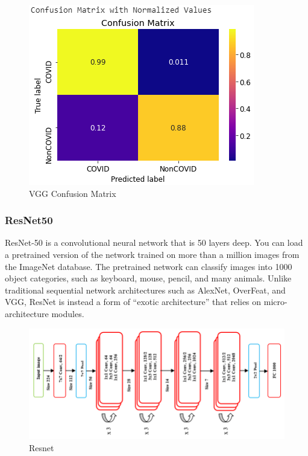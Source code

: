 \documentclass[a4paper,12pt]{report}
\begin{document}
  \begin{figure}[h] %
   \begin{center}
   \includegraphics[scale=0.6]{vgg_chest_cm.png}
   \caption{VGG Confusion Matrix}
  \end{center}
  \end{figure}
\subsubsection{ResNet50}
ResNet-50 is a convolutional neural network that is 50 layers deep. You can load a pretrained version of the network trained on more than a million images from the ImageNet database. The pretrained network can classify images into 1000 object categories, such as keyboard, mouse, pencil, and many animals. Unlike traditional sequential network architectures such as AlexNet, OverFeat, and VGG, ResNet is instead a form of “exotic architecture” that relies on micro-architecture modules.
\begin{figure}[h] %
   \begin{center}
   \includegraphics[scale=0.4]{resnet.png}
   \caption{Resnet}
  \end{center}
  \end{figure}
\end{document}
